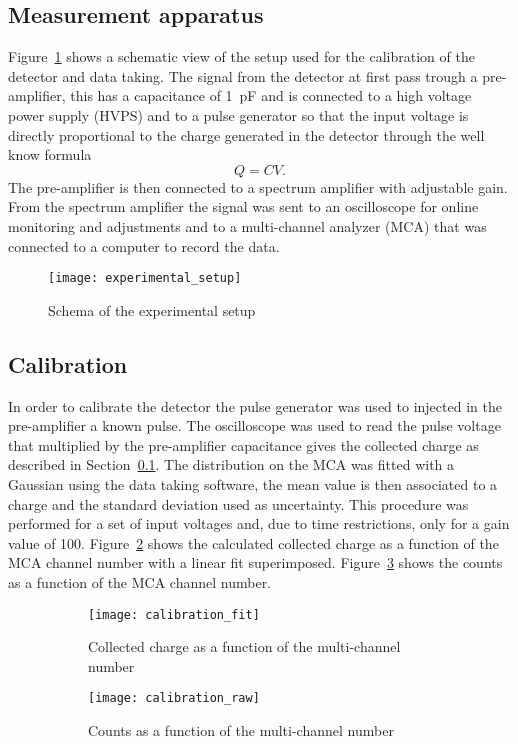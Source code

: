 \subsection{Measurement apparatus}
\label{sec:meas-appar}
Figure~\ref{fig:exp_setup} shows a schematic view of the setup used for the
calibration of the detector and data taking. The signal from the detector at
first pass trough a pre-amplifier, this has a capacitance of 1~pF and is
connected to a high voltage power supply (HVPS) and to a pulse generator so that
the input voltage is directly proportional to the charge generated in the
detector through the well know formula\autocite{Knoll:RadMeasurement}
\begin{equation}
  \label{eq:capacitance}
  Q = CV.
\end{equation}
The pre-amplifier is then connected to a spectrum amplifier with adjustable
gain. From the spectrum amplifier the signal was sent to an oscilloscope for
online monitoring and adjustments and to a multi-channel analyzer (MCA) that was
connected to a computer to record the data.
\begin{figure}[!h]
  \centering
  \texttt{[image: experimental\_setup]}
  \caption{Schema of the experimental setup}
  \label{fig:exp_setup}
\end{figure}

\subsection{Calibration}
\label{sec:calibration}
In order to calibrate the detector the pulse generator was used to injected in
the pre-amplifier a known pulse. The oscilloscope was used to read the pulse
voltage that multiplied by the pre-amplifier capacitance gives the collected
charge as described in Section~\ref{sec:meas-appar}. The distribution on the MCA
was fitted with a Gaussian using the data taking software, the mean value is
then associated to a charge and the standard deviation used as uncertainty. This
procedure was performed for a set of input voltages and, due to time
restrictions, only for a gain value of 100. Figure~\ref{fig:calibration_fit}
shows the calculated collected charge as a function of the MCA channel number
with a linear fit superimposed. Figure~\ref{fig:calibration_raw} shows the
counts as a function of the MCA channel number.
\begin{figure}[!h]
  \centering
  \begin{subfigure}[t]{.48\linewidth}
    \texttt{[image: calibration\_fit]}
    \caption{Collected charge as a function of the multi-channel number}
    \label{fig:calibration_fit}
  \end{subfigure}
  \begin{subfigure}[t]{.48\linewidth}
    \texttt{[image: calibration\_raw]}
    \caption{Counts as a function of the multi-channel number}
    \label{fig:calibration_raw}
  \end{subfigure}
  \caption{}
  \label{fig:calibration}
\end{figure}
